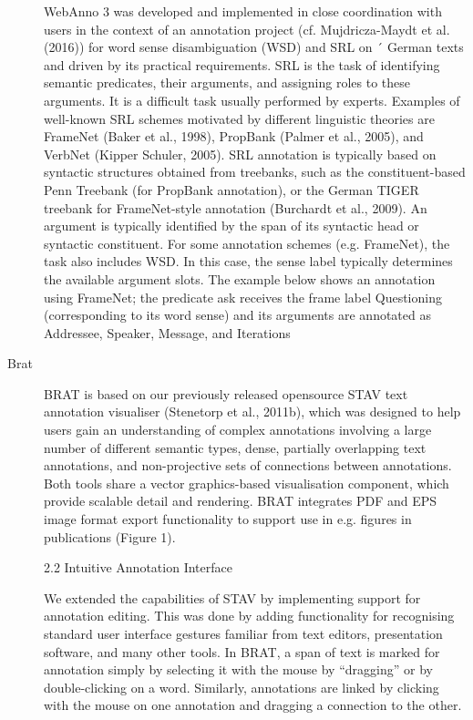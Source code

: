 \begin{description}
    WebAnno 3 was developed and implemented in close coordination with users in the context of an
    annotation project (cf. Mujdricza-Maydt et al. (2016)) for word sense disambiguation (WSD) and SRL on ´
    German texts and driven by its practical requirements. SRL is the task of identifying semantic predicates,
    their arguments, and assigning roles to these arguments. It is a difficult task usually performed by experts.
    Examples of well-known SRL schemes motivated by different linguistic theories are FrameNet (Baker
    et al., 1998), PropBank (Palmer et al., 2005), and VerbNet (Kipper Schuler, 2005). SRL annotation
    is typically based on syntactic structures obtained from treebanks, such as the constituent-based Penn
    Treebank (for PropBank annotation), or the German TIGER treebank for FrameNet-style annotation
    (Burchardt et al., 2009). An argument is typically identified by the span of its syntactic head or syntactic
    constituent. For some annotation schemes (e.g. FrameNet), the task also includes WSD. In this case, the
    sense label typically determines the available argument slots. The example below shows an annotation
    using FrameNet; the predicate ask receives the frame label Questioning (corresponding to its word sense)
    and its arguments are annotated as Addressee, Speaker, Message, and Iterations

    \item[Brat]
    BRAT is based on our previously released opensource STAV text annotation visualiser (Stenetorp et al., 2011b), which was designed to help
    users gain an understanding of complex annotations involving a large number of different semantic types, dense, partially overlapping text annotations, and non-projective sets of connections
    between annotations. Both tools share a vector
    graphics-based visualisation component, which
    provide scalable detail and rendering. BRAT integrates PDF and EPS image format export functionality to support use in e.g. figures in publications (Figure 1).

    2.2 Intuitive Annotation Interface

    We extended the capabilities of STAV by implementing support for annotation editing. This was
    done by adding functionality for recognising standard user interface gestures familiar from text editors, presentation software, and many other tools.
    In BRAT, a span of text is marked for annotation
    simply by selecting it with the mouse by “dragging” or by double-clicking on a word. Similarly,
    annotations are linked by clicking with the mouse
    on one annotation and dragging a connection to
    the other.


\end{description}
